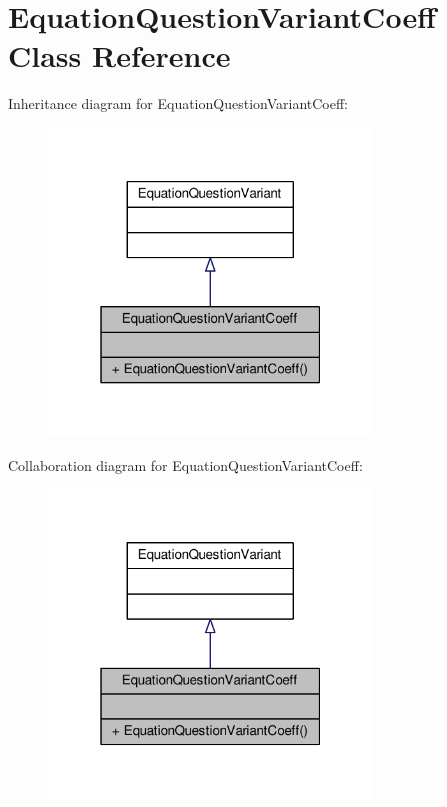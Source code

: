 \hypertarget{classEquationQuestionVariantCoeff}{}\section{Equation\+Question\+Variant\+Coeff Class Reference}
\label{classEquationQuestionVariantCoeff}


Inheritance diagram for Equation\+Question\+Variant\+Coeff\+:
\nopagebreak
\begin{figure}[H]
\begin{center}
\leavevmode
\includegraphics[width=244pt]{classEquationQuestionVariantCoeff__inherit__graph}
\end{center}
\end{figure}


Collaboration diagram for Equation\+Question\+Variant\+Coeff\+:
\nopagebreak
\begin{figure}[H]
\begin{center}
\leavevmode
\includegraphics[width=244pt]{classEquationQuestionVariantCoeff__coll__graph}
\end{center}
\end{figure}
